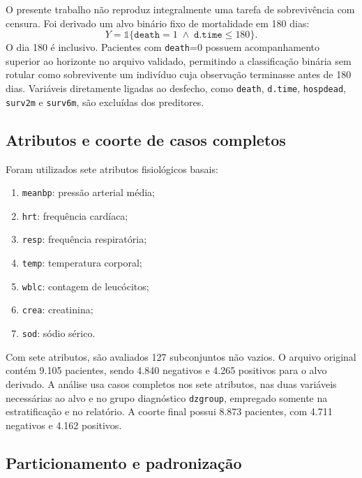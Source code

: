 O presente trabalho não reproduz integralmente uma tarefa de sobrevivência com censura. Foi derivado um alvo binário fixo de mortalidade em 180 dias:
\begin{equation}
  Y=\mathbb{1}\{\texttt{death}=1 \;\land\; \texttt{d.time}\leq 180\}.
  \label{eq:death180}
\end{equation}
O dia 180 é inclusivo. Pacientes com \texttt{death}=0 possuem acompanhamento superior ao horizonte no arquivo validado, permitindo a classificação binária sem rotular como sobrevivente um indivíduo cuja observação terminasse antes de 180 dias. Variáveis diretamente ligadas ao desfecho, como \texttt{death}, \texttt{d.time}, \texttt{hospdead}, \texttt{surv2m} e \texttt{surv6m}, são excluídas dos preditores.

\subsection{Atributos e coorte de casos completos}

Foram utilizados sete atributos fisiológicos basais:

\begin{enumerate}[label=$X_{\arabic*}$:]
  \item \texttt{meanbp}: pressão arterial média;
  \item \texttt{hrt}: frequência cardíaca;
  \item \texttt{resp}: frequência respiratória;
  \item \texttt{temp}: temperatura corporal;
  \item \texttt{wblc}: contagem de leucócitos;
  \item \texttt{crea}: creatinina;
  \item \texttt{sod}: sódio sérico.
\end{enumerate}

Com sete atributos, são avaliados 127 subconjuntos não vazios. O arquivo original contém 9.105 pacientes, sendo 4.840 negativos e 4.265 positivos para o alvo derivado. A análise usa casos completos nos sete atributos, nas duas variáveis necessárias ao alvo e no grupo diagnóstico \texttt{dzgroup}, empregado somente na estratificação e no relatório. A coorte final possui 8.873 pacientes, com 4.711 negativos e 4.162 positivos.

\subsection{Particionamento e padronização}
\label{sec:support2-split}


